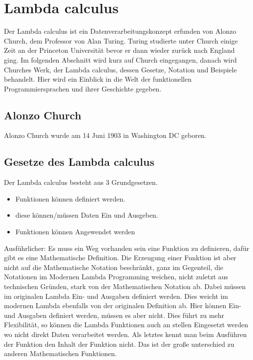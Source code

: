 \section{Lambda calculus}
Der Lambda calculus ist ein Datenverarbeitungskonzept erfunden von Alonzo Church, dem Professor von Alan Turing. Turing studierte unter Church einige Zeit an der Princeton Universität bevor er dann wieder zurück nach England ging. Im folgenden Abschnitt wird kurz auf Church eingegangen, danach wird Churches Werk, der Lambda calculus, dessen Gesetze, Notation und Beispiele behandelt. Hier wird ein Einblick in die Welt der funktionellen Programmiersprachen und ihrer Geschichte gegeben.
\subsection{Alonzo Church}
Alonzo Church wurde am 14 Juni 1903 in Washington DC geboren. \cite{lifechurch}
\subsection{Gesetze des Lambda calculus}
Der Lambda calculus besteht aus 3 Grundgesetzen.
\begin{itemize}
\item Funktionen können definiert werden.
\item diese können/müssen Daten Ein und Ausgeben.
\item Funktionen können Angewendet werden
\end{itemize}
Ausführlicher: Es muss ein Weg vorhanden sein eine Funktion zu definieren, dafür gibt es eine Mathematische Definition. Die Erzeugung einer Funktion ist aber nicht auf die Mathematische Notation beschränkt, ganz im Gegenteil, die Notationen im Modernen Lambda Programming weichen, nicht zuletzt aus technischen Gründen, stark von der Mathematischen Notation ab. Dabei müssen im originalen Lambda Ein- und Ausgaben definiert werden. Dies weicht im modernen Lambda ebenfalls von der originalen Definition ab. Hier können Ein- und Ausgaben definiert werden, müssen es aber nicht. Dies führt zu mehr Flexibilität, so können die Lambda Funktionen auch an stellen Eingesetzt werden wo nicht direkt Daten verarbeitet werden. Als letztes kennt man beim Ausführen der Funktion den Inhalt der Funktion nicht. Das ist der große unterschied zu anderen Mathematischen Funktionen.\cite{lambdacalculus}
